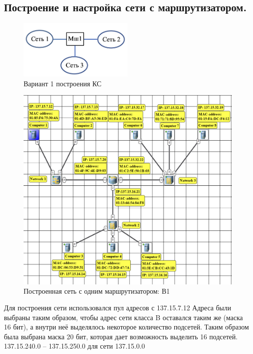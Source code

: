 \documentclass[12pt,onecolumn]{article}
\begin{document}
\subsection*{Построение и настройка сети с маршрутизатором.}
\begin{figure}[H]
    \centering
    \includegraphics[width=0.5\textwidth]{image/part-1/task1.png}
    \caption{Вариант 1 построения КС}
\end{figure}
\begin{figure}[H]
    \centering
    \includegraphics[width=\textwidth]{image/part-1/net1.png}
    \caption{Построенная сеть с одним маршрутизатором: В1}
\end{figure}
Для построения сети использовался пул адресов с 137.15.7.12
Адреса были выбраны таким образом, чтобы адрес сети класса B 
оставался таким же (маска 16 бит), а внутри неё выделялось некоторое количество подсетей.
Таким образом была выбрана маска 20 бит, которая дает возможность выделить 16 подсетей.
137.15.240.0 -- 137.15.250.0 для сети 137.15.0.0
\end{document}
